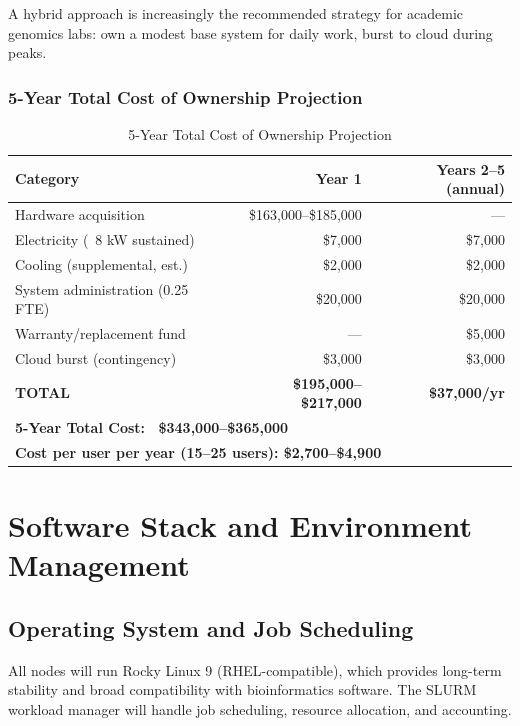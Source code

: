 A hybrid approach is increasingly the recommended strategy for academic genomics labs: own a modest base system for daily work, burst to cloud during peaks.

\subsubsection{5-Year Total Cost of Ownership Projection}

\begin{table}[htbp]
\centering
\caption{5-Year Total Cost of Ownership Projection}
\begin{tabular}{lrr}
\hline
\textbf{Category} & \textbf{Year 1} & \textbf{Years 2--5 (annual)} \\
\hline
Hardware acquisition & \$163,000--\$185,000 & --- \\
Electricity (~8 kW sustained) & \$7,000 & \$7,000 \\
Cooling (supplemental, est.) & \$2,000 & \$2,000 \\
System administration (0.25 FTE) & \$20,000 & \$20,000 \\
Warranty/replacement fund & --- & \$5,000 \\
Cloud burst (contingency) & \$3,000 & \$3,000 \\
\hline
\textbf{TOTAL} & \textbf{\$195,000--\$217,000} & \textbf{\$37,000/yr} \\
\hline
\multicolumn{3}{l}{\textbf{5-Year Total Cost: ~\$343,000--\$365,000}} \\
\multicolumn{3}{l}{\textbf{Cost per user per year (15--25 users): \$2,700--\$4,900}} \\
\hline
\end{tabular}
\end{table}

\section{Software Stack and Environment Management}

\subsection{Operating System and Job Scheduling}

All nodes will run Rocky Linux 9 (RHEL-compatible), which provides long-term stability and broad compatibility with bioinformatics software. The SLURM workload manager \parencite{slurm2023} will handle job scheduling, resource allocation, and accounting.

